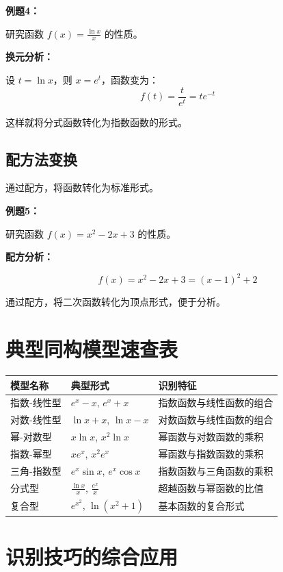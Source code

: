 \documentclass[a4paper,11pt]{ctexrep}
\newcommand{\exampleicon}{\ModeBadge[highlight]{例题}}
\newcommand{\analysisicon}{\ModeBadge[secondary]{分析}}
\theoremstyle{definition}
\begin{document}
\exampleicon \textbf{例题4：}

研究函数 $f(x) = \frac{\ln x}{x}$ 的性质。

\analysisicon \textbf{换元分析：}

设 $t = \ln x$，则 $x = e^t$，函数变为：
$$f(t) = \frac{t}{e^t} = te^{-t}$$

这样就将分式函数转化为指数函数的形式。

\subsection{配方法变换}

通过配方，将函数转化为标准形式。

\exampleicon \textbf{例题5：}

研究函数 $f(x) = x^2 - 2x + 3$ 的性质。

\analysisicon \textbf{配方分析：}

$$f(x) = x^2 - 2x + 3 = (x-1)^2 + 2$$

通过配方，将二次函数转化为顶点形式，便于分析。

\section{典型同构模型速查表}

\begin{definitionbox}[同构模型速查表]
\begin{tabularx}{\textwidth}{|l|X|X|}
\hline
\textbf{模型名称} & \textbf{典型形式} & \textbf{识别特征} \\
\hline
指数-线性型 & $e^x - x$, $e^x + x$ & 指数函数与线性函数的组合 \\
\hline
对数-线性型 & $\ln x + x$, $\ln x - x$ & 对数函数与线性函数的组合 \\
\hline
幂-对数型 & $x\ln x$, $x^2\ln x$ & 幂函数与对数函数的乘积 \\
\hline
指数-幂型 & $xe^x$, $x^2e^x$ & 幂函数与指数函数的乘积 \\
\hline
三角-指数型 & $e^x\sin x$, $e^x\cos x$ & 指数函数与三角函数的乘积 \\
\hline
分式型 & $\frac{\ln x}{x}$, $\frac{e^x}{x}$ & 超越函数与幂函数的比值 \\
\hline
复合型 & $e^{x^2}$, $\ln(x^2+1)$ & 基本函数的复合形式 \\
\hline
\end{tabularx}
\end{definitionbox}

\section{识别技巧的综合应用}
\end{document}
